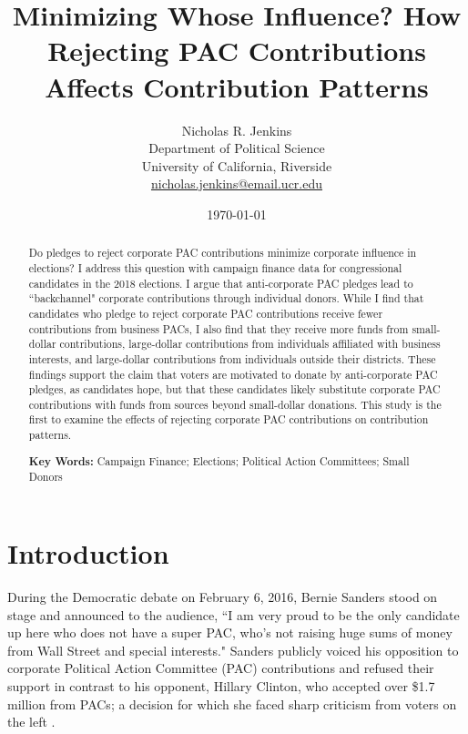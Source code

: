 \documentclass[12pt]{article}
\title{\textbf{Minimizing Whose Influence? How Rejecting PAC Contributions Affects Contribution Patterns}}
\author{Nicholas R. Jenkins \\ Department of Political Science\\ University of California, Riverside\\ \href{mailto:nicholas.jenkins@email.ucr.edu}{nicholas.jenkins@email.ucr.edu}}
\date{\today}
\begin{document}
\maketitle
\thispagestyle{empty}

\begin{abstract}

Do pledges to reject corporate PAC contributions minimize corporate influence in elections? I address this question with campaign finance data for congressional candidates in the 2018 elections. I argue that anti-corporate PAC pledges lead to ``backchannel" corporate contributions through individual donors. While I find that candidates who pledge to reject corporate PAC contributions receive fewer contributions from business PACs, I also find that they receive more funds from small-dollar contributions, large-dollar contributions from individuals affiliated with business interests, and large-dollar contributions from individuals outside their districts. These findings support the claim that voters are motivated to donate by anti-corporate PAC pledges, as candidates hope, but that these candidates likely substitute corporate PAC contributions with funds from sources beyond small-dollar donations. This study is the first to examine the effects of rejecting corporate PAC contributions on contribution patterns.

\medskip

\noindent \textbf{Key Words:} Campaign Finance; Elections; Political Action Committees; Small Donors

\end{abstract}

\pagebreak

\cleardoublepage
\setcounter{page}{1}

\doublespacing

\section{Introduction} \label{sec: intro}

During the Democratic debate on February 6, 2016, Bernie Sanders stood on stage and announced to the audience, ``I am very proud to be the only candidate up here who does not have a super PAC, who’s not raising huge sums of money from Wall Street and special interests." Sanders publicly voiced his opposition to corporate Political Action Committee (PAC) contributions and refused their support in contrast to his opponent, Hillary Clinton, who accepted over \$1.7 million from PACs; a decision for which she faced sharp criticism from voters on the left \citep{seitz-wald2015}. 
\end{document}
